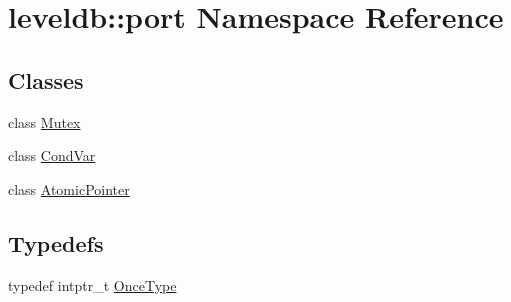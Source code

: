 \hypertarget{namespaceleveldb_1_1port}{\section{leveldb\-:\-:port Namespace Reference}
\label{namespaceleveldb_1_1port}
}
\subsection*{Classes}
\begin{DoxyCompactItemize}
\item 
class \hyperlink{classleveldb_1_1port_1_1_mutex}{Mutex}
\item 
class \hyperlink{classleveldb_1_1port_1_1_cond_var}{Cond\-Var}
\item 
class \hyperlink{classleveldb_1_1port_1_1_atomic_pointer}{Atomic\-Pointer}
\end{DoxyCompactItemize}
\subsection*{Typedefs}
\begin{DoxyCompactItemize}
\item 
typedef intptr\-\_\-t \hyperlink{namespaceleveldb_1_1port_a80651a8fb458d9b7b3c1f492f9abd055}{Once\-Type}
\end{DoxyCompactItemize}
